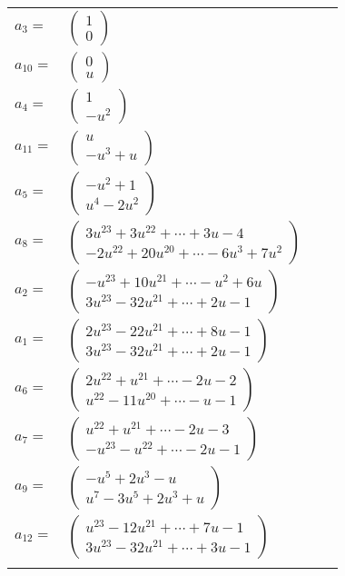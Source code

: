 \documentclass[1p]{elsarticle_modified}
\theoremstyle{definition}
\begin{document}
\begin{tabular}{m{7pt} m{180pt} m{7pt} m{180pt} }
\flushright $a_{3}=$&$\begin{pmatrix}1\\0\end{pmatrix}$ \\
\flushright $a_{10}=$&$\begin{pmatrix}0\\u\end{pmatrix}$ \\
\flushright $a_{4}=$&$\begin{pmatrix}1\\- u^2\end{pmatrix}$ \\
\flushright $a_{11}=$&$\begin{pmatrix}u\\- u^3+u\end{pmatrix}$ \\
\flushright $a_{5}=$&$\begin{pmatrix}- u^2+1\\u^4-2 u^2\end{pmatrix}$ \\
\flushright $a_{8}=$&$\begin{pmatrix}3 u^{23}+3 u^{22}+\cdots+3 u-4\\-2 u^{22}+20 u^{20}+\cdots-6 u^3+7 u^2\end{pmatrix}$ \\
\flushright $a_{2}=$&$\begin{pmatrix}- u^{23}+10 u^{21}+\cdots- u^2+6 u\\3 u^{23}-32 u^{21}+\cdots+2 u-1\end{pmatrix}$ \\
\flushright $a_{1}=$&$\begin{pmatrix}2 u^{23}-22 u^{21}+\cdots+8 u-1\\3 u^{23}-32 u^{21}+\cdots+2 u-1\end{pmatrix}$ \\
\flushright $a_{6}=$&$\begin{pmatrix}2 u^{22}+u^{21}+\cdots-2 u-2\\u^{22}-11 u^{20}+\cdots- u-1\end{pmatrix}$ \\
\flushright $a_{7}=$&$\begin{pmatrix}u^{22}+u^{21}+\cdots-2 u-3\\- u^{23}- u^{22}+\cdots-2 u-1\end{pmatrix}$ \\
\flushright $a_{9}=$&$\begin{pmatrix}- u^5+2 u^3- u\\u^7-3 u^5+2 u^3+u\end{pmatrix}$ \\
\flushright $a_{12}=$&$\begin{pmatrix}u^{23}-12 u^{21}+\cdots+7 u-1\\3 u^{23}-32 u^{21}+\cdots+3 u-1\end{pmatrix}$\\&\end{tabular}
\end{document}
